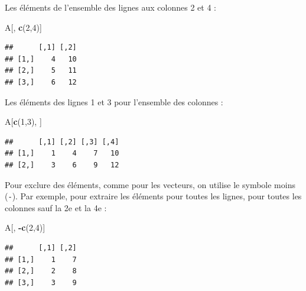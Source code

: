 \documentclass[
  11pt,
]{book}
\newenvironment{Shaded}{\begin{snugshade}}{\end{snugshade}}
\newcommand{\DecValTok}[1]{\textcolor[rgb]{0.00,0.00,0.81}{#1}}
\newcommand{\FunctionTok}[1]{\textcolor[rgb]{0.13,0.29,0.53}{\textbf{#1}}}
\newcommand{\NormalTok}[1]{#1}
\newcommand{\SpecialCharTok}[1]{\textcolor[rgb]{0.81,0.36,0.00}{\textbf{#1}}}
\numberwithin{equation}{section}
\numberwithin{countremarque}{section}
\begin{document}
Les éléments de l'ensemble des lignes aux colonnes 2 et 4 :

\begin{Shaded}
\begin{Highlighting}[]
\NormalTok{A[, }\FunctionTok{c}\NormalTok{(}\DecValTok{2}\NormalTok{,}\DecValTok{4}\NormalTok{)]}
\end{Highlighting}
\end{Shaded}

\begin{lstlisting}
##      [,1] [,2]
## [1,]    4   10
## [2,]    5   11
## [3,]    6   12
\end{lstlisting}

Les éléments des lignes 1 et 3 pour l'ensemble des colonnes :

\begin{Shaded}
\begin{Highlighting}[]
\NormalTok{A[}\FunctionTok{c}\NormalTok{(}\DecValTok{1}\NormalTok{,}\DecValTok{3}\NormalTok{), ]}
\end{Highlighting}
\end{Shaded}

\begin{lstlisting}
##      [,1] [,2] [,3] [,4]
## [1,]    1    4    7   10
## [2,]    3    6    9   12
\end{lstlisting}

Pour exclure des éléments, comme pour les vecteurs, on utilise le symbole moins (\texttt{-}). Par exemple, pour extraire les éléments pour toutes les lignes, pour toutes les colonnes sauf la 2e et la 4e :

\begin{Shaded}
\begin{Highlighting}[]
\NormalTok{A[, }\SpecialCharTok{{-}}\FunctionTok{c}\NormalTok{(}\DecValTok{2}\NormalTok{,}\DecValTok{4}\NormalTok{)]}
\end{Highlighting}
\end{Shaded}

\begin{lstlisting}
##      [,1] [,2]
## [1,]    1    7
## [2,]    2    8
## [3,]    3    9
\end{lstlisting}
\end{document}
